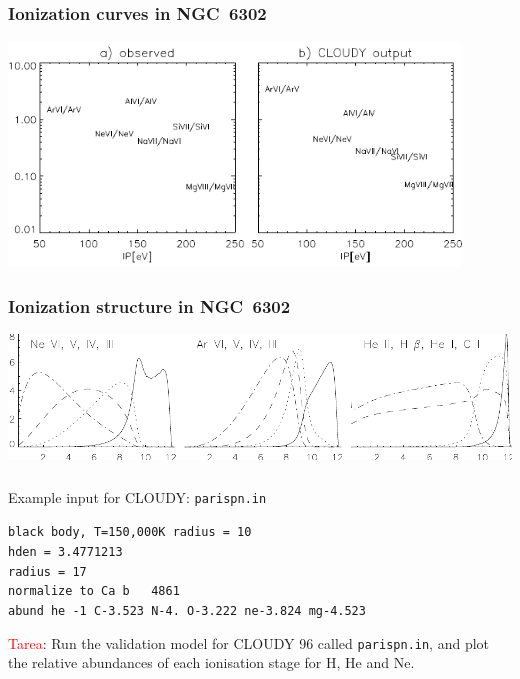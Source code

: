 \begin{frame}\frametitle{Ionization curves in NGC~6302}

\begin{center}
  \includegraphics[width=0.9\textwidth,height=!]{./C/ioncurve.pdf}
\end{center}


\end{frame}
\begin{frame}\frametitle{Ionization structure in NGC~6302}

\begin{center}
  \includegraphics[width=\textwidth,height=!]{./C/struct_n6302.pdf}
\end{center}


\end{frame}
\begin{frame}\frametitle{}



Example input for  CLOUDY: {\tt parispn.in}\\

\medskip
\medskip
\medskip

{\tt black body, T=150,000K radius = 10\\
hden = 3.4771213\\
radius = 17\\
normalize to   Ca b  ~ 4861\\
abund he -1 C-3.523 N-4. O-3.222 ne-3.824 mg-4.523\\ 
}

\medskip

\textcolor{red}{Tarea}: Run the validation model for  CLOUDY 96 called
{\tt parispn.in}, and plot the relative abundances of each ionisation
stage for H, He and Ne. 

\end{frame}
